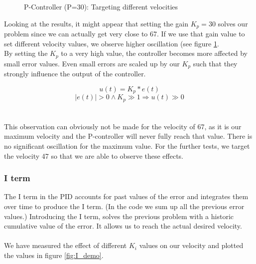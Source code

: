 \begin{figure}
    \centering
{}
    \caption{P-Controller (P=30): Targeting different velocities} \label{fig:P30}
\end{figure}
Looking at the results, it might appear that setting the gain $K_p = 30$ solves our problem since we can actually get very close to 67. If we use that gain value to set different velocity values, we observe higher oscillation (see figure \ref{fig:P30}.\\
By setting the $K_p$ to a very high value, the controller becomes more affected by small error values. Even small errors are scaled up by our $K_p$ such that they strongly influence the output of the controller.

$$u(t) = K_p * e(t)$$
$$|e(t)| > 0 \wedge K_p \gg 1 \Rightarrow u(t) \gg 0$$\\\\

This observation can obviously not be made for the velocity of 67, as it is our maximum velocity and the P-controller will never fully reach that value. There is no significant oscillation for the maximum value. For the further tests, we target the velocity 47 so that we are able to observe these effects.

\subsubsection*{I term}
The I term in the PID accounts for past values of the error and integrates them over time to produce the I term. (In the code we sum up all the previous error values.)
Introducing the I term, solves the previous problem with a historic cumulative value of the error. It allows us to reach the actual desired velocity.\\\\
We have measured the effect of different $K_i$ values on our velocity and plotted the values in figure \ref{fig:I_demo}.


